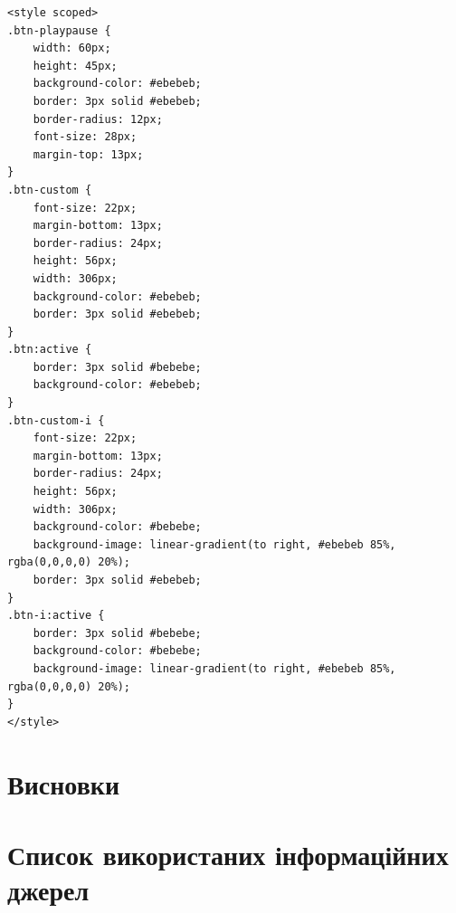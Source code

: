 \documentclass[oneside,14pt]{extarticle}
\begin{document}
\begin{normalsize}
\begin{tiny}
\begin{lstlisting}
<style scoped>
.btn-playpause {
	width: 60px;
	height: 45px;
	background-color: #ebebeb;
	border: 3px solid #ebebeb;
	border-radius: 12px;
	font-size: 28px;
	margin-top: 13px;
}
.btn-custom {
	font-size: 22px;
	margin-bottom: 13px;
	border-radius: 24px;
	height: 56px;
	width: 306px;
	background-color: #ebebeb; 
	border: 3px solid #ebebeb;
}
.btn:active {
	border: 3px solid #bebebe;
	background-color: #ebebeb;
}
.btn-custom-i {
	font-size: 22px;
	margin-bottom: 13px;
	border-radius: 24px;
	height: 56px;
	width: 306px;
	background-color: #bebebe; 
	background-image: linear-gradient(to right, #ebebeb 85%, rgba(0,0,0,0) 20%); 
	border: 3px solid #ebebeb;
}
.btn-i:active {
	border: 3px solid #bebebe;
	background-color: #bebebe;
	background-image: linear-gradient(to right, #ebebeb 85%, rgba(0,0,0,0) 20%); 
}
</style>
		\end{lstlisting}
	\end{tiny}
	
	\section{Висновки}
	   
	 \section{Список використаних інформаційних джерел}
\end{normalsize}
\end{document}
